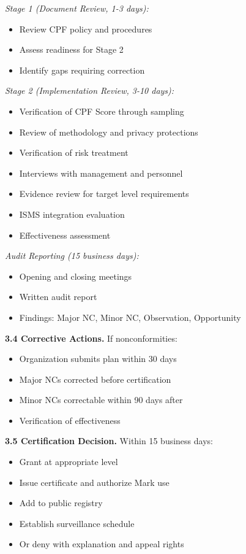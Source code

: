 \documentclass[11pt,a4paper]{article}
\begin{document}
\textit{Stage 1 (Document Review, 1-3 days):}
\begin{itemize}
\item Review CPF policy and procedures
\item Assess readiness for Stage 2
\item Identify gaps requiring correction
\end{itemize}

\textit{Stage 2 (Implementation Review, 3-10 days):}
\begin{itemize}
\item Verification of CPF Score through sampling
\item Review of methodology and privacy protections
\item Verification of risk treatment
\item Interviews with management and personnel
\item Evidence review for target level requirements
\item ISMS integration evaluation
\item Effectiveness assessment
\end{itemize}

\textit{Audit Reporting (15 business days):}
\begin{itemize}
\item Opening and closing meetings
\item Written audit report
\item Findings: Major NC, Minor NC, Observation, Opportunity
\end{itemize}

\textbf{3.4 Corrective Actions.} If nonconformities:
\begin{itemize}
\item Organization submits plan within 30 days
\item Major NCs corrected before certification
\item Minor NCs correctable within 90 days after
\item Verification of effectiveness
\end{itemize}

\textbf{3.5 Certification Decision.} Within 15 business days:
\begin{itemize}
\item Grant at appropriate level
\item Issue certificate and authorize Mark use
\item Add to public registry
\item Establish surveillance schedule
\item Or deny with explanation and appeal rights
\end{itemize}
\end{document}
